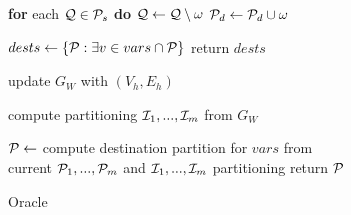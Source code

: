 \begin{algorithm}[t!]
\begin{distribalgo}[1]
	\vspace{1.0mm}
    \STATE \textbf{for} each $\mathcal{Q} \in \mathcal{P}_s$ \textbf{do} $\mathcal{Q} \leftarrow \mathcal{Q} \setminus \omega$
    \STATE $\mathcal{P}_d \leftarrow \mathcal{P}_d \cup \omega$
	\ENDINDENT

  \vspace{1.0mm}
    
%	
		\STATE $dests \leftarrow \{ \mathcal{P} : \exists v \in vars \cap \mathcal{P} \}$
		\STATE return $dests$
	\ENDINDENT
	
	\vspace{4.0mm}

		\STATE update $G_W$ with $(V_h,E_h)$
	\ENDINDENT
	
	\vspace{1.0mm}
    
		\STATE compute partitioning $\mathcal{I}_1, ..., \mathcal{I}_m$ from $G_W$
	\ENDINDENT
	
	\vspace{1.0mm}
    
		\STATE $\mathcal{P} \leftarrow$ compute destination partition for $vars$ from\\ \hspace{8mm}current $\mathcal{P}_1, ..., \mathcal{P}_m$ and $\mathcal{I}_1, ..., \mathcal{I}_m$ partitioning
		\STATE return $\mathcal{P}$
	\ENDINDENT	
	
%        


\caption{Oracle}
\label{alg:oracle_proxy}
\end{distribalgo}
\end{algorithm}